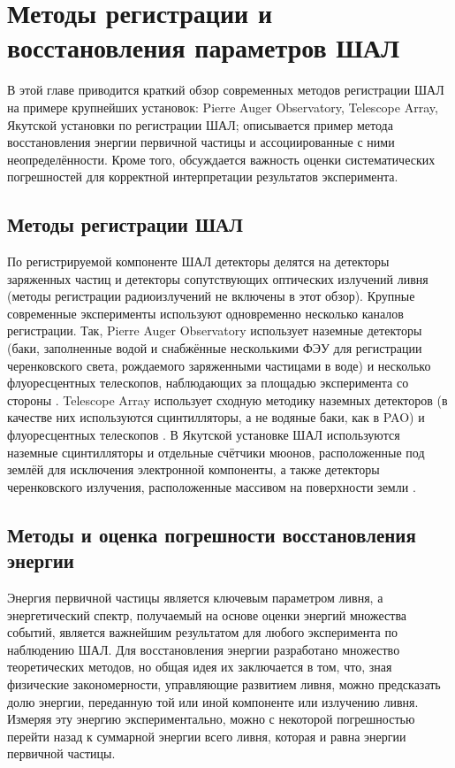 \chapter{Методы регистрации и восстановления параметров ШАЛ}

\label{chapt:review}

В этой главе приводится краткий обзор современных методов регистрации ШАЛ на примере крупнейших установок: Pierre Auger Observatory, Telescope Array, Якутской установки по регистрации ШАЛ; описывается пример метода восстановления энергии первичной частицы и ассоциированные с ними неопределённости. Кроме того, обсуждается важность оценки систематических погрешностей для корректной интерпретации результатов эксперимента.


\section{Методы регистрации ШАЛ}

По регистрируемой компоненте ШАЛ детекторы делятся на детекторы заряженных частиц и детекторы сопутствующих оптических излучений ливня (методы регистрации радиоизлучений не включены в этот обзор). Крупные современные эксперименты используют одновременно несколько каналов регистрации. Так, Pierre Auger Observatory использует наземные детекторы (баки, заполненные водой и снабжённые несколькими ФЭУ для регистрации черенковского света, рождаемого заряженными частицами в воде) и несколько флуоресцентных телескопов, наблюдающих за площадью эксперимента со стороны \cite{Abraham2010}. Telescope Array использует сходную методику наземных детекторов (в качестве них используются сцинтилляторы, а не водяные баки, как в PAO) и флуоресцентных телескопов \cite{AbuZayyad2013}. В Якутской установке ШАЛ используются наземные сцинтилляторы и отдельные счётчики мюонов, расположенные под землёй для исключения электронной компоненты, а также детекторы черенковского излучения, расположенные массивом на поверхности земли \cite{Ivanov2007}.


\section{Методы и оценка погрешности восстановления энергии}

Энергия первичной частицы является ключевым параметром ливня, а энергетический спектр, получаемый на основе оценки энергий множества событий, является важнейшим результатом для любого эксперимента по наблюдению ШАЛ. Для восстановления энергии разработано множество теоретических методов, но общая идея их заключается в том, что, зная физические закономерности, управляющие развитием ливня, можно предсказать долю энергии, переданную той или иной компоненте или излучению ливня. Измеряя эту энергию экспериментально, можно с некоторой погрешностью перейти назад к суммарной энергии всего ливня, которая и равна энергии первичной частицы.

